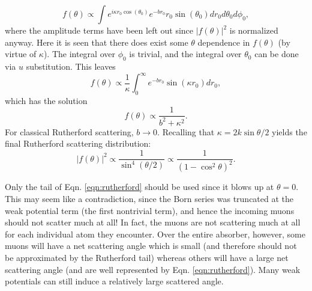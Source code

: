 %
\begin{equation} \nonumber
f(\theta)\propto \int e^{i\kappa r_0\cos(\theta_0)}e^{-br_0}r_0\sin(\theta_0)dr_0 d\theta_0 d\phi_0,
\end{equation}
where the amplitude terms have been left out since $|f(\theta)|^2$ is normalized anyway. Here it is seen that there does exist some $\theta$ dependence in $f(\theta)$ (by virtue of $\kappa$). The integral over $\phi_0$ is trivial, and the integral over $\theta_0$ can be done via $u$ substitution. This leaves
\begin{equation} \nonumber
f(\theta)\propto \frac{1}{\kappa}\int_0^\infty e^{-br_0}\sin(\kappa r_0) dr_0,
\end{equation}
%
which has the solution
\begin{equation}\nonumber
f(\theta)\propto\frac{1}{b^2+\kappa^2}.
\end{equation}
For classical Rutherford scattering, $b\rightarrow 0$. Recalling that $\kappa=2k\sin{\theta/2}$ yields the final Rutherford scattering distribution:
\begin{equation}
\label{eqn:rutherford}
|f(\theta)|^2\propto \frac{1}{\sin^4(\theta/2)}\propto\frac{1}{(1-\cos^2{\theta})^2}.
\end{equation}

Only the tail of Eqn. \ref{eqn:rutherford} should be used since it blows up at $\theta=0$. This may seem like a contradiction, since the Born series was truncated at the weak potential term (the first nontrivial term), and hence the incoming muons should not scatter much at all! In fact, the muons are not scattering much at all for each individual atom they encounter. Over the entire absorber, however, some muons will have a net scattering angle which is small (and therefore should not be approximated by the Rutherford tail) whereas others will have a large net scattering angle (and are well represented by Eqn. \ref{eqn:rutherford}). Many weak potentials can still induce a relatively large scattered angle.
